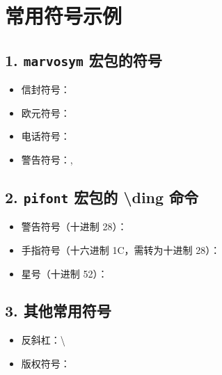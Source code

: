 \documentclass{ctexart}
\begin{document}
\section*{常用符号示例}

\subsection*{1. \texttt{marvosym} 宏包的符号}
\begin{itemize}
    \item 信封符号：\Letter
    \item 欧元符号：\EUR
    \item 电话符号：\Telefon
    \item 警告符号：,
\end{itemize}

\subsection*{2. \texttt{pifont} 宏包的 \textbackslash ding 命令}
\begin{itemize}
    \item 警告符号（十进制 28）：
    \item 手指符号（十六进制 1C，需转为十进制 28）： %
    \item 星号（十进制 52）：
\end{itemize}

\subsection*{3. 其他常用符号}
\begin{itemize}
    \item 反斜杠：\textbackslash
    \item 版权符号：\textcopyright
\end{itemize}
\end{document}
